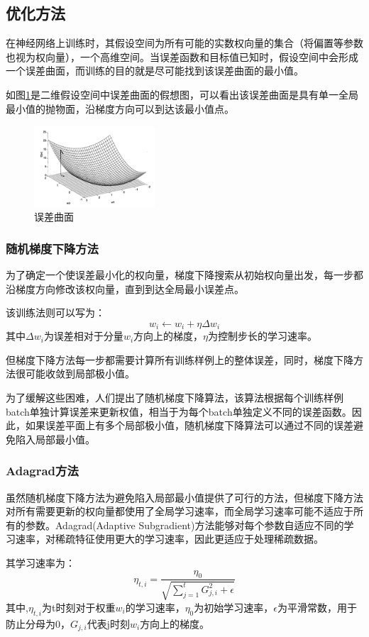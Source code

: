 \subsection{优化方法}
在神经网络上训练时，其假设空间为所有可能的实数权向量的集合（将偏置等参数也视为权向量），一个高维空间。当误差函数和目标值已知时，假设空间中会形成一个误差曲面，而训练的目的就是尽可能找到该误差曲面的最小值。\par
如图\ref{ann3}是二维假设空间中误差曲面的假想图，可以看出该误差曲面是具有单一全局最小值的抛物面，沿梯度方向可以到达该最小值点。\par
\begin{figure}[!hbp]
\begin{center}
\includegraphics[width=0.4\textwidth]{graphic/ann3.png}
\caption{误差曲面\cite{ml2006} \label{ann3}}
\end{center}
\end{figure}
\subsubsection{随机梯度下降方法}
为了确定一个使误差最小化的权向量，梯度下降搜索从初始权向量出发，每一步都沿梯度方向修改该权向量，直到到达全局最小误差点。\par
该训练法则可以写为：\cite{ml2006}
\begin{equation}
w_i \leftarrow w_i + \eta\Delta w_i
\end{equation}
其中$\Delta w_i$为误差相对于分量$w_i$方向上的梯度，$\eta$为控制步长的学习速率。\par
但梯度下降方法每一步都需要计算所有训练样例上的整体误差，同时，梯度下降方法很可能收敛到局部极小值。\par
为了缓解这些困难，人们提出了随机梯度下降算法，该算法根据每个训练样例batch单独计算误差来更新权值，相当于为每个batch单独定义不同的误差函数。因此，如果误差平面上有多个局部极小值，随机梯度下降算法可以通过不同的误差避免陷入局部最小值。
\subsubsection{Adagrad方法}
虽然随机梯度下降方法为避免陷入局部最小值提供了可行的方法，但梯度下降方法对所有需要更新的权向量都使用了全局学习速率，而全局学习速率可能不适应于所有的参数。Adagrad(Adaptive Subgradient)方法\cite{adagrad}能够对每个参数自适应不同的学习速率，对稀疏特征使用更大的学习速率，因此更适应于处理稀疏数据。\par
其学习速率为：
\begin{equation}
\eta_{t, i} = \frac{\eta_0}{ \sqrt{\sum_{j=1}^{t}{G_{j,i}^2} + \epsilon}}
\end{equation}
其中,$\eta_{t, i}$为t时刻对于权重$w_i$的学习速率，$\eta_0$为初始学习速率，$\epsilon$为平滑常数，用于防止分母为0，$G_{j,i}$代表j时刻$w_i$方向上的梯度。

